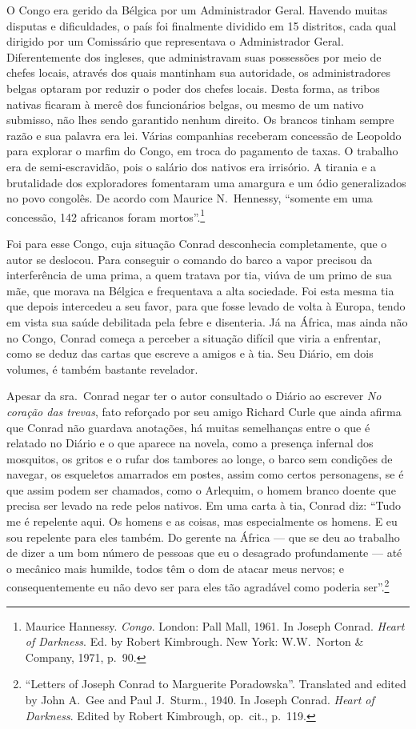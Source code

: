 O Congo era gerido da Bélgica por um Administrador Geral. Havendo
muitas disputas e dificuldades, o país foi finalmente dividido em 15
distritos, cada qual dirigido por um Comissário que representava o
Administrador Geral. Diferentemente dos ingleses, que administravam
suas possessões por meio de chefes locais, através dos quais mantinham
sua autoridade, os administradores belgas optaram por reduzir o poder
dos chefes locais. Desta forma, as tribos nativas ficaram à mercê dos
funcionários belgas, ou mesmo de um nativo submisso, 
não lhes sendo garantido nenhum direito. Os brancos tinham sempre 
razão e sua palavra era  lei. Várias companhias
receberam concessão de Leopoldo para explorar o marfim do Congo, em
troca  do pagamento de taxas. O trabalho era de semi{}-escravidão, pois
o salário dos nativos era irrisório. A tirania e a brutalidade dos
exploradores fomentaram uma amargura e um ódio generalizados no povo
congolês. De acordo com Maurice N.~Hennessy, ``somente em uma concessão,
142 africanos foram mortos''.\footnote{ Maurice Hannessy. \textit{Congo}. 
London: Pall Mall, 1961. In Joseph Conrad.
\textit{Heart of Darkness}. Ed. by  Robert Kimbrough. New York:
W.W.~Norton \& Company, 1971, p.~90.}

Foi para esse Congo, cuja situação Conrad desconhecia completamente, que
o autor se deslocou. Para conseguir o comando do barco a vapor precisou
da interferência de uma prima, a quem tratava por tia, viúva de um
primo de sua mãe, que morava na Bélgica e frequentava a alta sociedade.
Foi esta mesma tia que depois intercedeu a seu favor, para que fosse
levado de volta à Europa, tendo em vista sua saúde debilitada pela
febre e disenteria. Já na África, mas ainda não no Congo, Conrad 
começa a perceber a situação difícil que viria a enfrentar, como se
deduz das cartas que escreve a amigos e à tia. Seu Diário, em dois
volumes, é também bastante revelador.

Apesar da sra.~Conrad negar ter o autor consultado o Diário ao
escrever \textit{No coração das trevas}, fato
reforçado por seu amigo Richard Curle que ainda afirma que Conrad não
guardava anotações, há muitas semelhanças entre o que é relatado no
Diário e o que aparece na novela, como a presença infernal dos
mosquitos, os gritos  e o rufar dos tambores ao longe, o barco sem
condições de navegar, os esqueletos amarrados em postes, assim como 
certos personagens, se é que assim podem ser chamados, como o Arlequim, o
homem branco doente que precisa ser levado na rede pelos nativos. Em
uma carta à tia, Conrad diz: ``Tudo me é repelente aqui. Os homens e as
coisas, mas especialmente os homens. E eu sou repelente para eles
também. Do gerente na África --- que se deu ao trabalho de dizer  a um
bom número de pessoas que eu o desagrado profundamente --- até o mecânico
mais humilde, todos têm o dom de atacar meus nervos; e consequentemente
eu não devo ser para eles tão agradável como poderia
ser''.\footnote{ ``Letters of Joseph Conrad to Marguerite Poradowska''. Translated and edited by
John A.~Gee and Paul J.~Sturm., 1940. In Joseph Conrad. \textit{Heart of Darkness}. 
Edited by Robert Kimbrough, op.~cit., p.~119.}


